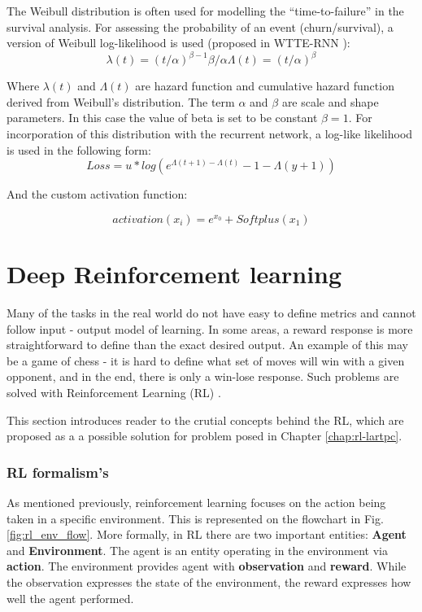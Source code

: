 The Weibull distribution is often used for modelling the ``time-to-failure'' in the survival analysis.
For assessing the probability of an event (churn/survival), a version of Weibull log-likelihood is used (proposed in WTTE-RNN \cite{martinsson:Thesis:2016}):
\begin{equation}
    \lambda(t) = (t/\alpha)^{\beta-1}\beta/\alpha
\Lambda(t) = (t/\alpha)^{\beta}
\end{equation}


Where $\lambda(t)$ and $\Lambda(t)$ are hazard function and cumulative hazard function derived from Weibull's distribution.
The term $\alpha$ and $\beta$ are scale and shape parameters. In this case the value of beta is set to be constant $\beta = 1$.
For incorporation of this distribution with the recurrent network, a log-like likelihood is used in the following form:
$$
Loss = u * log(e^{\Lambda(t+1)-\Lambda(t)}-1 - \Lambda(y+1))
$$

And the custom activation function:

\begin{equation}
    activation(x_{i}) = e^{x_{0}} + Softplus(x_{1})
    \label{math:acti}
\end{equation}
\section{Deep Reinforcement learning}
\label{sec:deep_rl}

Many of the tasks in the real world do not have easy to define metrics and cannot follow input - output model of learning.
In some areas, a reward response is more straightforward to define than the exact desired output.
An example of this may be a game of chess - it is hard to define what set of moves will win with a given opponent, and in the end, there is only a win-lose response.
Such problems are solved with Reinforcement Learning (RL) \cite{Lapan18}.

This section introduces reader to the crutial concepts behind the RL, which are proposed as a a possible solution for problem posed in Chapter \ref{chap:rl-lartpc}.

\subsubsection{RL formalism's}
\label{sec:rl_mdp}

As mentioned previously, reinforcement learning focuses on the action being taken in a specific environment.
This is represented on the flowchart in Fig. \ref{fig:rl_env_flow}.
More formally, in RL there are two important entities: \textbf{Agent} and \textbf{Environment}.
The agent is an entity operating in the environment via \textbf{action}.
The environment provides agent with \textbf{observation} and \textbf{reward}.
While the observation expresses the state of the environment, the reward expresses how well the agent performed.


